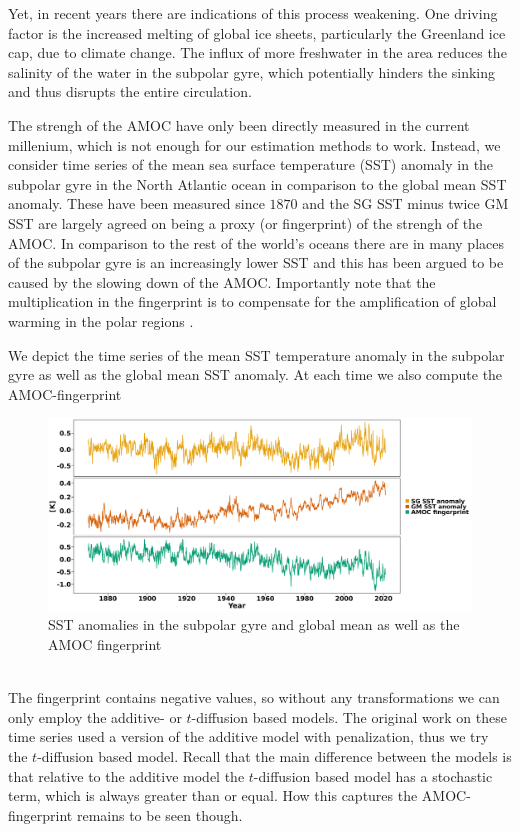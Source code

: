 Yet, in recent years there are indications of this process weakening. One driving factor is the increased melting of global ice sheets, particularly the Greenland ice cap, due to climate change. The influx of more freshwater in the area reduces the salinity of the water in the subpolar gyre, which potentially hinders the sinking and thus disrupts the entire circulation. 

The strengh of the AMOC have only been directly measured in the current millenium, which is not enough for our estimation methods to work. Instead, we consider time series of the mean sea surface temperature (SST) anomaly in the subpolar gyre in the North Atlantic ocean in comparison to the global mean SST anomaly. These have been measured since $1870$ and the SG SST minus twice GM SST are largely agreed on being a proxy (or fingerprint) of the strengh of the AMOC. In comparison to the rest of the world's oceans there are in many places of the subpolar gyre is an increasingly lower SST and this has been argued to be caused by the slowing down of the AMOC. Importantly note that the multiplication in the fingerprint is to compensate for the amplification of global warming in the polar regions \cite[caption of figure 1]{Ditlevsen2023}.

We depict the time series of the mean SST temperature anomaly in the subpolar gyre as well as the global mean SST anomaly. At each time we also compute the AMOC-fingerprint
\begin{figure}[h!]
    \begin{center}
    \includegraphics[scale = .06]{figures/AMOC_data_plot.jpeg}
    \caption{SST anomalies in the subpolar gyre and global mean as well as the AMOC fingerprint}
    \label{figure:AMOC_plot}
    \end{center}
\end{figure}\\
The fingerprint contains negative values, so without any transformations we can only employ the additive- or $t$-diffusion based models. The original work on these time series \cite{Ditlevsen2023} used a version of the additive model with penalization, thus we try the $t$-diffusion based model. Recall that the main difference between the models is that relative to the additive model the $t$-diffusion based model has a stochastic term, which is always greater than or equal. How this captures the AMOC-fingerprint remains to be seen though.
